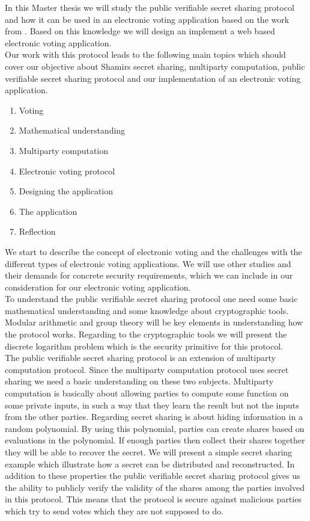 In this Master thesis we will study the public verifiable secret sharing protocol and how it can be used in an electronic voting application based on the work from \cite{Schoenmakers1999}. Based on this knowledge we will design an implement a web based electronic voting application.\\

\noindent
Our work with this protocol leads to the following main topics which should cover our objective about Shamirs secret sharing, multiparty computation, public verifiable secret sharing protocol and our implementation of an electronic voting application.

\begin{enumerate}
    \item Voting
    \item Mathematical understanding
    \item Multiparty computation
    \item Electronic voting protocol
    \item Designing the application
    \item The application
    \item Reflection
\end{enumerate}

\noindent
We start to describe the concept of electronic voting and the challenges with the different types of electronic voting applications. We will use other studies and their demands for concrete security requirements, which we can include in our consideration for our electronic voting application.  \\

\noindent
To understand the public verifiable secret sharing protocol one need some basic mathematical understanding and some knowledge about cryptographic tools. Modular arithmetic and group theory will be key elements in understanding how the protocol works. Regarding to the cryptographic tools we will present the discrete logarithm problem which is the security primitive for this protocol.\\

\noindent
The public verifiable secret sharing protocol is an extension of multiparty computation protocol. Since the multiparty computation protocol uses secret sharing we need a basic understanding on these two subjects. Multiparty computation is basically about allowing parties to compute some function on some private inputs, in such a way that they learn the result but not the inputs from the other parties. Regarding secret sharing is about hiding information in a random polynomial. By using this polynomial, parties can create shares based on evaluations in the polynomial. If enough parties then collect their shares together they will be able to recover the secret.  We will present a simple secret sharing example which illustrate how a secret can be distributed and reconstructed. In addition to these properties the public verifiable secret sharing protocol gives us the ability to publicly verify the validity of the shares among the parties involved in this protocol. This means that the protocol is secure against malicious parties which try to send votes which they are not supposed to do. \\

